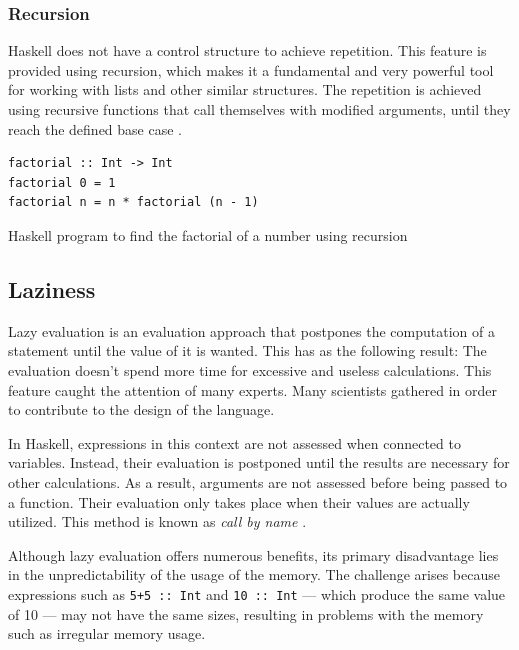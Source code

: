 \documentclass[a4paper, titlepage, twoside]{article}
\begin{document}
\subsubsection{Recursion}
\label{sec:orgd06d130}

Haskell does not have a control structure to achieve repetition. This feature is provided using recursion, which makes it a fundamental and very powerful tool for working with lists and other similar structures. The repetition is achieved using recursive functions that call themselves with modified arguments, until they reach the defined base case \autocite{kremerCPSC449Programming2015}.

\begin{listing}[htbp]
\begin{verbatim}
factorial :: Int -> Int
factorial 0 = 1
factorial n = n * factorial (n - 1)
\end{verbatim}
\caption{Haskell program to find the factorial of a number using recursion}
\end{listing}

\subsection{Laziness}
\label{sec:org296a2e2}

Lazy evaluation is an evaluation approach that postpones the computation of a statement until the value of it is wanted. This has as the following result: The evaluation doesn't spend more time for excessive and useless calculations. This feature caught the attention of many experts. Many scientists gathered in order to contribute to the design of the language.

In Haskell, expressions in this context are not assessed when connected to variables. Instead, their evaluation is postponed until the results are necessary for other calculations. As a result, arguments are not assessed before being passed to a function. Their evaluation only takes place when their values are actually utilized. This method is known as \emph{call by name} \autocite{haskellwikiHaskellHaskellWiki2023}.

Although lazy evaluation offers numerous benefits, its primary disadvantage lies in the unpredictability of the usage of the memory. The challenge arises because expressions such as \texttt{5+5 :: Int} and \texttt{10 :: Int} --- which produce the same value of 10 --- may not have the same sizes, resulting in problems with the memory such as irregular memory usage.
\end{document}
